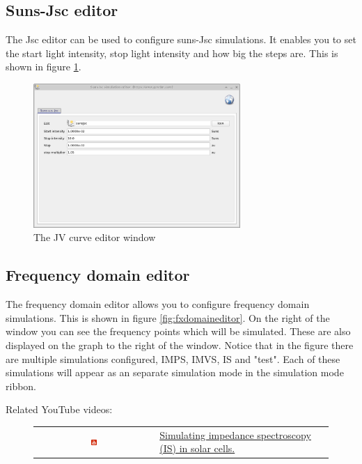 \subsection{Suns-Jsc editor}
The Jsc editor can be used to configure suns-Jsc simulations. It enables you to set the start light intensity, stop light intensity and how big the steps are. This is shown in figure \ref{fig:sunsjsceditor}.

\begin{figure}[H]
\centering
\includegraphics[width=0.7\textwidth,height=0.5\textwidth]{./images/suns_jsc_editor.png}
\caption{The JV curve editor window}
\label{fig:sunsjsceditor}
\end{figure}


\subsection{Frequency domain editor}
The frequency domain editor allows you to configure frequency domain simulations. This is shown in figure \ref{fig:fxdomaineditor}. On the right of the window you can see the frequency points which will be simulated. These are also displayed on the graph to the right of the window.  Notice that in the figure there are multiple simulations configured, IMPS, IMVS, IS and "test".  Each of these simulations will appear as an separate simulation mode in the simulation mode ribbon.

Related YouTube videos:
\begin{figure}[H]

\begin{tabular}{ c l }

\includegraphics[width=0.05\textwidth]{./images/youtube.png}

&
\href{https://www.youtube.com/watch?v=NJAsZeiB5FU}{Simulating impedance spectroscopy (IS) in solar cells.}

\end{tabular}
\end{figure}


